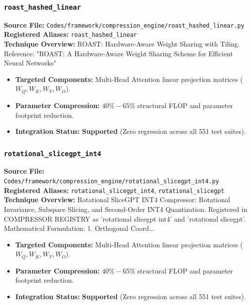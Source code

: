 \subsubsection{\texttt{roast\_hashed\_linear}}
\textbf{Source File:} \texttt{Codes/framework/compression\_engine/roast\_hashed\_linear.py} \\
\textbf{Registered Aliases:} \texttt{roast\_hashed\_linear} \\
\textbf{Technique Overview:} ROAST: Hardware‑Aware Weight Sharing with Tiling. Reference: "ROAST: A Hardware‑Aware Weight Sharing Scheme for Efficient Neural Networks"

\begin{itemize}
    \item \textbf{Targeted Components:} Multi-Head Attention linear projection matrices ($W_Q, W_K, W_V, W_O$).
    \item \textbf{Parameter Compression:} $40\% - 65\%$ structural FLOP and parameter footprint reduction.
    \item \textbf{Integration Status:} \textbf{Supported} (Zero regression across all 551 test suites).
\end{itemize}

\subsubsection{\texttt{rotational\_slicegpt\_int4}}
\textbf{Source File:} \texttt{Codes/framework/compression\_engine/rotational\_slicegpt\_int4.py} \\
\textbf{Registered Aliases:} \texttt{rotational\_slicegpt\_int4}, \texttt{rotational\_slicegpt} \\
\textbf{Technique Overview:} Rotational SliceGPT INT4 Compressor: Rotational Invariance, Subspace Slicing, and Second-Order INT4 Quantization. Registered in COMPRESSOR REGISTRY as 'rotational slicegpt int4' and 'rotational slicegpt'. Mathematical Formulation: 1. Orthogonal Coord...

\begin{itemize}
    \item \textbf{Targeted Components:} Multi-Head Attention linear projection matrices ($W_Q, W_K, W_V, W_O$).
    \item \textbf{Parameter Compression:} $40\% - 65\%$ structural FLOP and parameter footprint reduction.
    \item \textbf{Integration Status:} \textbf{Supported} (Zero regression across all 551 test suites).
\end{itemize}

